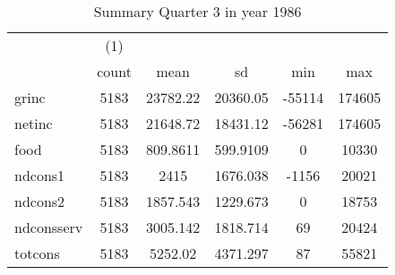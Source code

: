 \begin{table}[htbp]\centering
\def\sym#1{\ifmmode^{#1}\else\(^{#1}\)\fi}
\caption{Summary Quarter 3 in year 1986 \label{sum\_Q3\_y1986}}
\begin{tabular}{l*{1}{ccccc}}
\hline\hline
            &\multicolumn{1}{c}{(1)}&            &            &            &            \\
            &       count&        mean&          sd&         min&         max\\
\hline
grinc       &        5183&    23782.22&    20360.05&      -55114&      174605\\
netinc      &        5183&    21648.72&    18431.12&      -56281&      174605\\
food        &        5183&    809.8611&    599.9109&           0&       10330\\
ndcons1     &        5183&        2415&    1676.038&       -1156&       20021\\
ndcons2     &        5183&    1857.543&    1229.673&           0&       18753\\
ndconsserv  &        5183&    3005.142&    1818.714&          69&       20424\\
totcons     &        5183&     5252.02&    4371.297&          87&       55821\\
\hline\hline
\end{tabular}
\end{table}
